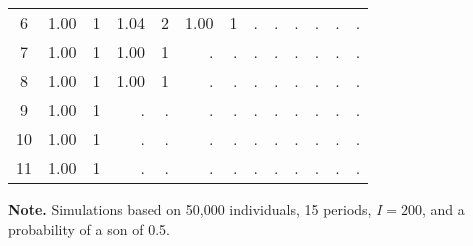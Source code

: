 \documentclass[12pt,letterpaper]{article}
\begin{document}
\begin{table}[!htp]
\begin{threeparttable}
\begin{tabular}{@{} c D{.}{.}{1.2} D{.}{.}{2.0} D{.}{.}{1.2} D{.}{.}{2.0} D{.}{.}{1.2} D{.}{.}{2.0} D{.}{.}{1.2} D{.}{.}{2.0} D{.}{.}{1.2} D{.}{.}{2.0} D{.}{.}{1.2} D{.}{.}{2.0} @{}}
 6             &  1.00 &     1 &  1.04 &     2 &  1.00 &     1 &     . &     . &     . &     . &     . &     . \\
 7             &  1.00 &     1 &  1.00 &     1 &     . &     . &     . &     . &     . &     . &     . &     . \\
 8             &  1.00 &     1 &  1.00 &     1 &     . &     . &     . &     . &     . &     . &     . &     . \\
 9             &  1.00 &     1 &     . &     . &     . &     . &     . &     . &     . &     . &     . &     . \\
 10            &  1.00 &     1 &     . &     . &     . &     . &     . &     . &     . &     . &     . &     . \\
 11            &  1.00 &     1 &     . &     . &     . &     . &     . &     . &     . &     . &     . &     . \\
\bottomrule
\end{tabular}
\begin{tablenotes} \tiny
\item \hspace*{-0.5em} \textbf{Note.} Simulations based on  50,000 individuals, 15 periods, $ I = 200 $,
 and a probability of a son of 0.5.
\end{tablenotes}
\end{threeparttable}
\normalsize
\end{table}
\end{document}
